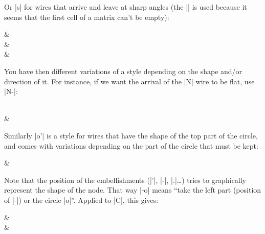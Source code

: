 \documentclass[a4paper]{ltxdoc}
\begin{document}
Or |s| for wires that arrive and leave at sharp angles (the |\zxN{}| is used because it seems that the first cell of a matrix can't be empty):
\begin{codeexample}[]
\begin{ZX}
  \zxN{}                           & \zxZ{\beta}\\
  \zxZ{\alpha} \ar[ru,s] \ar[rd,s] &\\
                                   & \zxZ{\gamma}
\end{ZX}
\end{codeexample}
You have then different variations of a style depending on the shape and/or direction of it. For instance, if we want the arrival of the |N| wire to be flat, use |N-|:
\begin{codeexample}[]
\begin{ZX}
  \zxZ{\alpha} \ar[rd,N-] \\
                         & \zxZ{\beta}
\end{ZX}
\end{codeexample}
Similarly |o'| is a style for wires that have the shape of the top part of the circle, and comes with variations depending on the part of the circle that must be kept:
\begin{codeexample}[width=0pt]
\begin{ZX}
  \zxZ{\alpha} \ar[r,o',green] \ar[r,o.,red] \ar[d,o-,blue] \ar[d,-o,purple] & \zxZ{\beta}\\
  \zxZ{\beta}
\end{ZX}
\end{codeexample}
Note that the position of the embellishments (|'|, |-|, |.|\dots{}) tries to graphically represent the shape of the node. That way |-o| means ``take the left part (position of |-|) or the circle |o|''. Applied to |C|, this gives:
\begin{codeexample}[]
\begin{ZX}
  \zxX{} \ar[d,C] \ar[r,C']  & \zxZ{} \ar[d,C-]\\
  \zxZ{} \ar[r,C.]           & \zxX{}
\end{ZX}
\end{codeexample}
\end{document}
